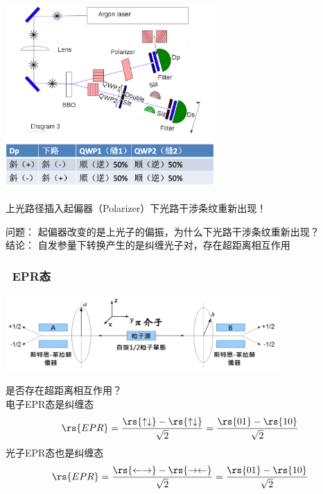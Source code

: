 \begin{frame}
    \frametitle{}
    \begin{center}
        \includegraphics[width=0.6\textwidth]{figs/c3.png}
    \end{center}
    上光路径插入起偏器（Polarizer）下光路干涉条纹重新出现！
\end{frame} 

\begin{frame}
    问题： 起偏器改变的是上光子的偏振，为什么下光路干涉条纹重新出现？\\ \vspace{0.8em}
    结论： 自发参量下转换产生的是纠缠光子对，存在超距离相互作用
\end{frame} 

\begin{frame} 
    \frametitle{~EPR态}
    \begin{center}
        \includegraphics[width=0.78\textwidth]{figs/28a.png}
    \end{center}
    {\Bullet} 是否存在超距离相互作用？\\
    {\Bullet} 电子EPR态是纠缠态\[\rs{EPR}=\frac{\rs{\uparrow \downarrow }-\rs{\uparrow \downarrow }}{\sqrt{2}} = \frac{\rs{01 }-\rs{10 }}{\sqrt{2}} \]
    {\Bullet} 光子EPR态也是纠缠态\[\rs{EPR}=\frac{\rs{\leftarrow \rightarrow }-\rs{\rightarrow \leftarrow }}{\sqrt{2}} = \frac{\rs{01 }-\rs{10 }}{\sqrt{2}} \]
\end{frame} 

